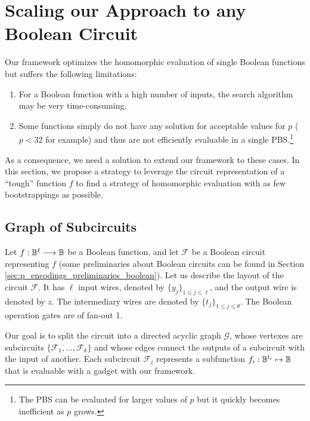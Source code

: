 \section{Scaling our Approach to any Boolean Circuit}
\label{sec:p_encodings_graphs}

Our framework optimizes the homomorphic evaluation of single Boolean functions but suffers the following limitations:

\begin{enumerate}
    \item For a Boolean function with a high number of inputs, the search algorithm may be very time-consuming.
    \item Some functions simply do not have any solution for acceptable values for $p$ ($p < 32$ for example) and thus are not efficiently evaluable in a single \gls{PBS}.\footnote{The \gls{PBS} can be evaluated for larger values of $p$ but it quickly becomes inefficient as $p$ grows.}
\end{enumerate}


As a consequence, we need a solution to extend our framework to these cases. In this section, we propose a strategy to leverage the circuit representation of a ``tough'' function $f$ to find a strategy of homomorphic evaluation with as few bootstrappings as possible.


\subsection{Graph of Subcircuits}
\label{sec:graph_definition}

Let $f: \mathbb{B}^\ell \longrightarrow \mathbb{B}$ be a Boolean function, and let $\mathcal{F}$ be a Boolean circuit representing $f$ (some preliminaries about Boolean circuits can be found in Section \ref{sec:p_encodings_preliminaries_boolean}). Let us describe the layout of the circuit $\mathcal{F}$. It has $\ell$ input wires, denoted by $\{y_j\}_{1 \le j \le \ell}$, and the output wire is denoted by $z$. The intermediary wires are denoted by $\{t_j\}_{1 \le j \le \theta}$. The Boolean operation gates are of fan-out 1. 


Our goal is to split the circuit into a directed acyclic graph $\mathcal{G}$, whose vertexes are subcircuits $\{\mathcal{F}_1, \dots, \mathcal{F}_k\}$ and whose edges connect the outputs of a subcircuit with the input of another. Each subcircuit $\mathcal{F}_i$ represents a subfunction $f_i: \mathbb{B}^{l_i} \mapsto \mathbb{B}$ that is evaluable with a gadget with our framework. 

